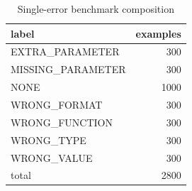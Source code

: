 \begin{table}[t]
\centering
\caption{Single-error benchmark composition}
\label{tab:benchmark_composition}
\begin{tabular}{lr}
\hline
label & examples \\
\hline
EXTRA\_PARAMETER & 300 \\
MISSING\_PARAMETER & 300 \\
NONE & 1000 \\
WRONG\_FORMAT & 300 \\
WRONG\_FUNCTION & 300 \\
WRONG\_TYPE & 300 \\
WRONG\_VALUE & 300 \\
total & 2800 \\
\hline
\end{tabular}
\end{table}
